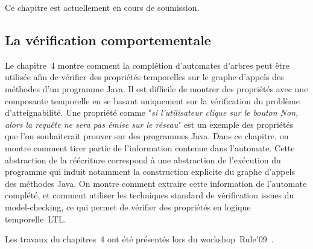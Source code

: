 Ce chapitre est actuellement en cours de soumission.%

\bigskip
\subsection*{La vérification comportementale}
Le chapitre~4 montre comment la complétion d'automates d'arbres peut être utilisée afin de vérifier 
des propriétés temporelles sur le graphe d'appels des méthodes d'un programme Java. Il est difficile 
de montrer des propriétés avec une composante temporelle en se basant uniquement sur la vérification du
problème d'atteignabilité. Une propriété comme 
"{\em si l'utilisateur clique sur le bouton Non, alors la requête ne sera pas émise sur le réseau}" est un exemple
des propriétés que l'on souhaiterait prouver sur des programmes Java. Dans ce chapitre, on montre comment tirer partie
de l'information contenue dans l'automate. %
Cette abstraction de la réécriture correspond à une abstraction 
de l'exécution du programme qui induit notamment la construction explicite du graphe d'appels des méthodes Java.
On montre comment extraire cette information de l'automate complété, et comment utiliser les techniques standard
de vérification issues du model-checking, ce qui permet de vérifier des propriétés en logique temporelle~LTL.

Les travaux du chapitres~4 ont été présentés lors du workshop~Rule'09~\cite{BoyerG-RULE09}.

\bigskip
